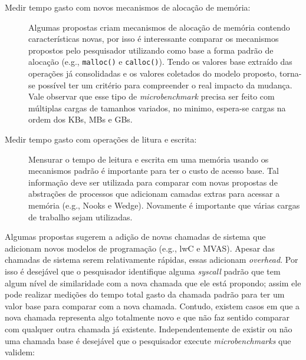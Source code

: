 \begin{description}

  \item[Medir tempo gasto com novos mecanismos de alocação de memória:]

Algumas propostas criam mecanismos de alocação de memória contendo
características novas, por isso é interessante comparar os mecanismos
propostos pelo pesquisador utilizando como base a forma padrão de alocação
(e.g., \texttt{malloc()} e \texttt{calloc()}). Tendo os valores base extraído
das operações já consolidadas e os valores coletados do modelo proposto,
torna-se possível ter um critério para compreender o real impacto da mudança.
Vale observar que esse tipo de \textit{microbenchmark} precisa ser feito com
múltiplas cargas de tamanhos variados, no minimo, espera-se cargas na ordem dos
KBs, MBs e GBs.

  \item[Medir tempo gasto com operações de litura e escrita:]

Mensurar o tempo de leitura e escrita em uma memória usando os mecanismos
padrão é importante para ter o custo de acesso base. Tal informação deve ser
utilizada para comparar com novas propostas de abstrações de processos que
adicionam camadas extras para acessar a memória (e.g., Nooks e Wedge).
Novamente é importante que várias cargas de trabalho sejam utilizadas.

\end{description}

Algumas propostas sugerem a adição de novas chamadas de sistema que adicionam
novos modelos de programação (e.g., lwC e MVAS). Apesar das chamadas de sistema
serem relativamente rápidas, essas adicionam \textit{overhead}. Por isso é
desejável que o pesquisador identifique alguma \textit{syscall} padrão que tem
algum nível de similaridade com a nova chamada que ele está propondo; assim ele
pode realizar medições do tempo total gasto da chamada padrão para ter um valor
base para comparar com a nova chamada. Contudo, existem casos em que a nova
chamada representa algo totalmente novo e que não faz sentido comparar com
qualquer outra chamada já existente. Independentemente de existir ou não uma
chamada base é desejável que o pesquisador execute \textit{microbenchmarks} que
validem:

